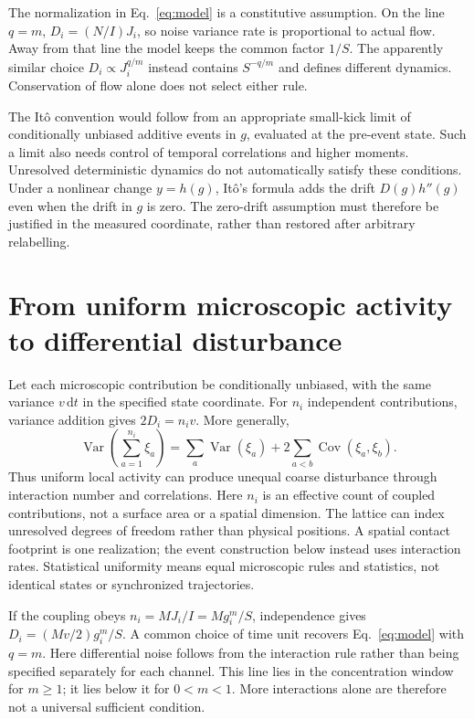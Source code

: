 \documentclass[11pt,a4paper]{article}
\newcommand{\dd}{\mathrm{d}}
\begin{document}
The normalization in Eq.~\eqref{eq:model} is a constitutive assumption. On the
line $q=m$, $D_i=(N/I)J_i$, so noise variance rate is proportional to actual
flow. Away from that line the model keeps the common factor $1/S$. The apparently
similar choice $D_i\propto J_i^{q/m}$ instead contains $S^{-q/m}$ and defines
different dynamics. Conservation of flow alone does not select either rule.

The It\^o convention would follow from an appropriate small-kick limit of
conditionally unbiased additive events in $g$, evaluated at the pre-event
state. Such a limit also needs control of temporal correlations and higher
moments. Unresolved deterministic dynamics do not automatically satisfy these
conditions. Under a nonlinear change $y=h(g)$, It\^o's formula adds the drift
$D(g)h''(g)$ even when the drift in $g$ is zero. The zero-drift assumption must
therefore be justified in the measured coordinate, rather than restored after
arbitrary relabelling.

\section{From uniform microscopic activity to differential disturbance}
\label{sec:contact}

Let each microscopic contribution be conditionally unbiased, with the same
variance $v\,\dd t$ in the specified state coordinate. For $n_i$ independent
contributions, variance addition gives $2D_i=n_iv$. More generally,
\begin{equation}
 \operatorname{Var}\!\left(\sum_{a=1}^{n_i}\xi_a\right)
 =\sum_a\operatorname{Var}(\xi_a)+2\sum_{a<b}\operatorname{Cov}(\xi_a,\xi_b).
 \label{eq:contacts}
\end{equation}
Thus uniform local activity can produce unequal coarse disturbance through
interaction number and correlations. Here $n_i$ is an effective count of coupled
contributions, not a surface area or a spatial dimension. The lattice can index
unresolved degrees of freedom rather than physical positions. A spatial contact
footprint is one realization; the event construction below instead uses interaction
rates. Statistical uniformity means equal microscopic
rules and statistics, not identical states or synchronized trajectories.

If the coupling obeys $n_i=M J_i/I=M g_i^m/S$, independence gives
$D_i=(Mv/2)g_i^m/S$. A common choice of time unit recovers Eq.~\eqref{eq:model}
with $q=m$. Here differential noise follows from the interaction rule rather than
being specified separately for each channel. This line lies in the concentration
window for $m\ge1$; it lies below it for $0<m<1$. More interactions alone are therefore
not a universal sufficient condition.
\end{document}
